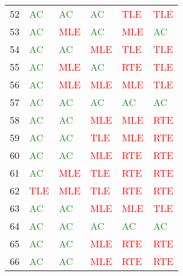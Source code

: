 \documentclass[thesis=M,english,hidelinks]{FITthesis}[2012/10/20]
\theoremstyle{definition}
\begin{document}
\begin{table}[ht]
\begin{tabular}{ m{1cm} | m{1.5cm} m{1.5cm} m{1.5cm} m{1.5cm} m{1.5cm} }
        52 & \textcolor{ForestGreen}{AC} & \textcolor{ForestGreen}{AC} & \textcolor{ForestGreen}{AC} & \textcolor{Red}{TLE} & \textcolor{Red}{TLE} \\
        53 & \textcolor{ForestGreen}{AC} & \textcolor{Red}{MLE} & \textcolor{ForestGreen}{AC} & \textcolor{Red}{MLE} & \textcolor{ForestGreen}{AC} \\
        54 & \textcolor{ForestGreen}{AC} & \textcolor{ForestGreen}{AC} & \textcolor{Red}{MLE} & \textcolor{Red}{TLE} & \textcolor{Red}{TLE} \\
        55 & \textcolor{ForestGreen}{AC} & \textcolor{Red}{MLE} & \textcolor{ForestGreen}{AC} & \textcolor{Red}{RTE} & \textcolor{Red}{TLE} \\
        56 & \textcolor{ForestGreen}{AC} & \textcolor{Red}{MLE} & \textcolor{Red}{MLE} & \textcolor{Red}{MLE} & \textcolor{Red}{TLE} \\
        57 & \textcolor{ForestGreen}{AC} & \textcolor{ForestGreen}{AC} & \textcolor{ForestGreen}{AC} & \textcolor{ForestGreen}{AC} & \textcolor{ForestGreen}{AC} \\
        58 & \textcolor{ForestGreen}{AC} & \textcolor{ForestGreen}{AC} & \textcolor{Red}{MLE} & \textcolor{Red}{MLE} & \textcolor{Red}{RTE} \\
        59 & \textcolor{ForestGreen}{AC} & \textcolor{ForestGreen}{AC} & \textcolor{Red}{TLE} & \textcolor{Red}{MLE} & \textcolor{Red}{RTE} \\
        60 & \textcolor{ForestGreen}{AC} & \textcolor{ForestGreen}{AC} & \textcolor{Red}{MLE} & \textcolor{Red}{RTE} & \textcolor{Red}{RTE} \\
        61 & \textcolor{ForestGreen}{AC} & \textcolor{Red}{MLE} & \textcolor{Red}{TLE} & \textcolor{Red}{RTE} & \textcolor{Red}{RTE} \\
        62 & \textcolor{Red}{TLE} & \textcolor{Red}{MLE} & \textcolor{Red}{TLE} & \textcolor{Red}{RTE} & \textcolor{Red}{RTE} \\
        63 & \textcolor{ForestGreen}{AC} & \textcolor{ForestGreen}{AC} & \textcolor{Red}{MLE} & \textcolor{Red}{MLE} & \textcolor{Red}{TLE} \\
        64 & \textcolor{ForestGreen}{AC} & \textcolor{ForestGreen}{AC} & \textcolor{ForestGreen}{AC} & \textcolor{ForestGreen}{AC} & \textcolor{ForestGreen}{AC} \\
        65 & \textcolor{ForestGreen}{AC} & \textcolor{ForestGreen}{AC} & \textcolor{Red}{MLE} & \textcolor{Red}{RTE} & \textcolor{Red}{RTE} \\
        66 & \textcolor{ForestGreen}{AC} & \textcolor{ForestGreen}{AC} & \textcolor{Red}{MLE} & \textcolor{Red}{RTE} & \textcolor{Red}{RTE} \\

\end{tabular}
\end{table}
\end{document}
